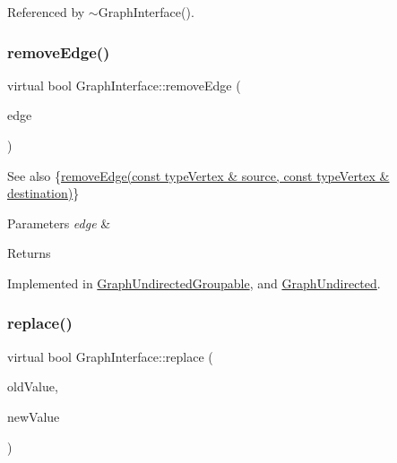 Referenced by $\sim$\+Graph\+Interface().

\mbox{\label{classGraphInterface_a954e2d16f474cce832f02d4495df3092}} 
\subsubsection{\texorpdfstring{remove\+Edge()}{removeEdge()}\hspace{0.1cm}{\footnotesize\ttfamily [2/2]}}
{\footnotesize\ttfamily virtual bool Graph\+Interface\+::remove\+Edge (\begin{DoxyParamCaption}\item[{const \hyperlink{classEdge}{Edge} \&}]{edge }\end{DoxyParamCaption})\hspace{0.3cm}{\ttfamily [pure virtual]}}

\begin{DoxySeeAlso}{See also}
\{\hyperlink{classGraphInterface_a1297fd6d7c9698197b5f570f2a9f3701}{remove\+Edge(const type\+Vertex \& source, const type\+Vertex \& destination)}\} 
\end{DoxySeeAlso}

\begin{DoxyParams}{Parameters}
{\em edge} & \\
\hline
\end{DoxyParams}
\begin{DoxyReturn}{Returns}

\end{DoxyReturn}


Implemented in \hyperlink{classGraphUndirectedGroupable_a88e02e4e05f304b289558922f1cb6aa1}{Graph\+Undirected\+Groupable}, and \hyperlink{classGraphUndirected_ad39275e7a8f7a39734916b8c5400a1d6}{Graph\+Undirected}.

\mbox{\label{classGraphInterface_a448a3c66fb5650339f84366257d322ee}} 
\subsubsection{\texorpdfstring{replace()}{replace()}}
{\footnotesize\ttfamily virtual bool Graph\+Interface\+::replace (\begin{DoxyParamCaption}\item[{const \hyperlink{edge_8h_a5fbd20c46956d479cb10afc9855223f6}{type\+Vertex} \&}]{old\+Value,  }\item[{const \hyperlink{edge_8h_a5fbd20c46956d479cb10afc9855223f6}{type\+Vertex} \&}]{new\+Value }\end{DoxyParamCaption})\hspace{0.3cm}{\ttfamily [pure virtual]}}

